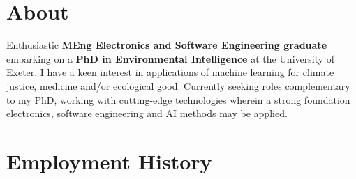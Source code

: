 \documentclass[]{cv-style}     %
\begin{document}
\section{About}
  \vspace{-0.4cm}

Enthusiastic \textbf{MEng Electronics and Software Engineering graduate} embarking on a \textbf{PhD in Environmental Intelligence} at the University of Exeter. I have a keen interest in applications of machine learning for climate justice, medicine and/or ecological good. Currently seeking roles complementary to my PhD, working with cutting-edge technologies wherein a strong foundation electronics, software engineering and AI methods may be applied.
  \vspace{-0.2cm}
\section{Employment History}
  \vspace{-0.3cm}
  
\end{document}
